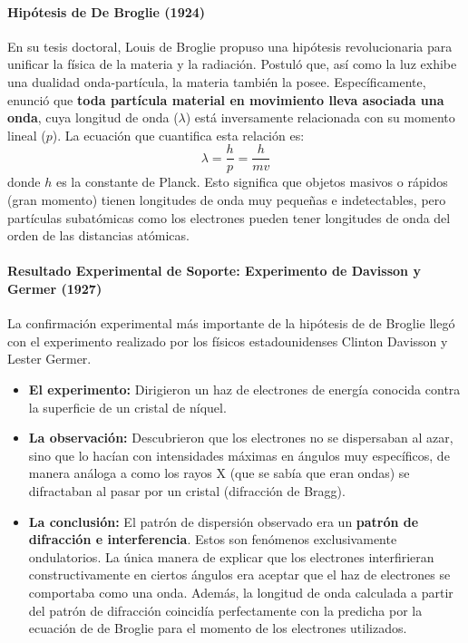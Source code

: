 \paragraph{Hipótesis de De Broglie (1924)}
En su tesis doctoral, Louis de Broglie propuso una hipótesis revolucionaria para unificar la física de la materia y la radiación. Postuló que, así como la luz exhibe una dualidad onda-partícula, la materia también la posee. Específicamente, enunció que \textbf{toda partícula material en movimiento lleva asociada una onda}, cuya longitud de onda ($\lambda$) está inversamente relacionada con su momento lineal ($p$).
La ecuación que cuantifica esta relación es:
$$ \lambda = \frac{h}{p} = \frac{h}{mv} $$
donde $h$ es la constante de Planck. Esto significa que objetos masivos o rápidos (gran momento) tienen longitudes de onda muy pequeñas e indetectables, pero partículas subatómicas como los electrones pueden tener longitudes de onda del orden de las distancias atómicas.

\paragraph{Resultado Experimental de Soporte: Experimento de Davisson y Germer (1927)}
La confirmación experimental más importante de la hipótesis de de Broglie llegó con el experimento realizado por los físicos estadounidenses Clinton Davisson y Lester Germer.
\begin{itemize}
    \item \textbf{El experimento:} Dirigieron un haz de electrones de energía conocida contra la superficie de un cristal de níquel.
    \item \textbf{La observación:} Descubrieron que los electrones no se dispersaban al azar, sino que lo hacían con intensidades máximas en ángulos muy específicos, de manera análoga a como los rayos X (que se sabía que eran ondas) se difractaban al pasar por un cristal (difracción de Bragg).
    \item \textbf{La conclusión:} El patrón de dispersión observado era un \textbf{patrón de difracción e interferencia}. Estos son fenómenos exclusivamente ondulatorios. La única manera de explicar que los electrones interfirieran constructivamente en ciertos ángulos era aceptar que el haz de electrones se comportaba como una onda. Además, la longitud de onda calculada a partir del patrón de difracción coincidía perfectamente con la predicha por la ecuación de de Broglie para el momento de los electrones utilizados.
\end{itemize}

